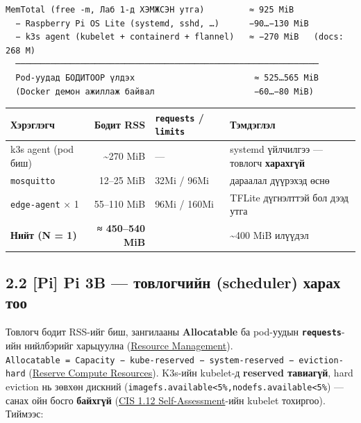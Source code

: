 \begin{verbatim}
MemTotal (free -m, Лаб 1-д ХЭМЖСЭН утга)         ≈ 925 MiB
  − Raspberry Pi OS Lite (systemd, sshd, …)      −90…−130 MiB
  − k3s agent (kubelet + containerd + flannel)   ≈ −270 MiB   (docs: 268 M)
  ─────────────────────────────────────────────────────────────
  Pod-уудад БОДИТООР үлдэх                        ≈ 525…565 MiB
  (Docker демон ажиллаж байвал                    −60…−80 MiB)
\end{verbatim}

\begingroup\scriptsize\begin{longtable}[]{@{}lrll@{}}
\toprule
Хэрэглэгч & Бодит RSS & \texttt{requests} / \texttt{limits} & Тэмдэглэл\tabularnewline
\midrule
\endhead
k3s agent (pod биш) & \textasciitilde270 MiB & --- & systemd үйлчилгээ --- товлогч \textbf{харахгүй}\tabularnewline
\texttt{mosquitto} & 12--25 MiB & 32Mi / 96Mi & дараалал дүүрэхэд өснө\tabularnewline
\texttt{edge-agent} × 1 & 55--110 MiB & 96Mi / 160Mi & TFLite дүгнэлттэй бол дээд утга\tabularnewline
\textbf{Нийт (N = 1)} & \textbf{≈ 450--540 MiB} & & \textasciitilde400 MiB илүүдэл\tabularnewline
\bottomrule
\end{longtable}\endgroup

\hypertarget{pi-pi-3b-ux442ux43eux432ux43bux43eux433ux447ux438ux439ux43d-scheduler-ux445ux430ux440ux430ux445-ux442ux43eux43e}{%
\subsection{2.2 {[}Pi{]} Pi 3B --- товлогчийн (scheduler) харах тоо}\label{pi-pi-3b-ux442ux43eux432ux43bux43eux433ux447ux438ux439ux43d-scheduler-ux445ux430ux440ux430ux445-ux442ux43eux43e}}

Товлогч бодит RSS-ийг биш, зангилааны \textbf{Allocatable} ба pod-уудын \textbf{\texttt{requests}}-ийн нийлбэрийг харьцуулна (\href{https://kubernetes.io/docs/concepts/configuration/manage-resources-containers/}{Resource Management}). \texttt{Allocatable\ =\allowbreak{}\ Capacity\ −\ kube-reserved\ −\ system-reserved\ −\ eviction-hard} (\href{https://kubernetes.io/docs/tasks/administer-cluster/reserve-compute-resources/}{Reserve Compute Resources}). K3s-ийн kubelet-д \textbf{reserved тавиагүй}, hard eviction нь зөвхөн дискний (\texttt{imagefs.\allowbreak{}available\textless{}5\%,nodefs.\allowbreak{}available\textless{}5\%}) --- санах ойн босго \textbf{байхгүй} (\href{https://docs.k3s.io/security/self-assessment-1.12}{CIS 1.\allowbreak{}12 Self-Assessment}-ийн kubelet тохиргоо). Тиймээс:

